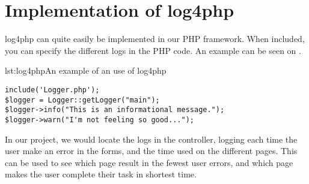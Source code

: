 \section{Implementation of log4php}
log4php can quite easily be implemented in our PHP framework.
When included, you can specify the different logs in the PHP code. An example can be seen on .
\begin{code}{lst:log4php}{An example of an use of log4php}
\begin{lstlisting}
include('Logger.php');
$logger = Logger::getLogger("main");
$logger->info("This is an informational message.");
$logger->warn("I'm not feeling so good...");
\end{lstlisting}
\end{code}

In our project, we would locate the logs in the controller, logging each time the user make an error in the forms, and the time used on the different pages. This can be used to see which page result in the fewest user errors, and which page makes the user complete their task in shortest time.